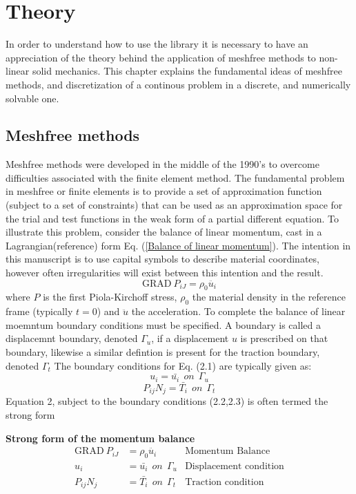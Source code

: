 

\chapter{Theory}		
In order to understand how to use the library it is necessary to have an appreciation of the theory behind the application of meshfree methods to non-linear solid mechanics. This chapter explains the fundamental ideas of meshfree methods, and discretization of a continous problem in a discrete, and numerically solvable one. 
\section{Meshfree methods}
Meshfree methods were developed in the middle of the 1990's to overcome difficulties associated with the finite element method. The fundamental problem in meshfree or finite elements is to provide a set of approximation function (subject to a set of constraints) that can be used as an approximation space for the trial and test functions in the weak form of a partial different equation.  To illustrate this problem, consider the balance of linear momentum, cast in a Lagrangian(reference) form Eq. (\ref{Balance of linear momentum}). The intention in this manuscript is to use capital symbols to describe material coordinates, however often irregularities will exist between this intention and the result. 
\begin{equation}\label{Balance of linear momentum}
\text{GRAD} ~ P_{iJ} = \rho_0 \ddot{u_i}
\end{equation}
where $P$ is the first Piola-Kirchoff stress, $\rho_0$ the material density in the reference frame (typically $t=0$) and $\ddot{u}$ the acceleration. To complete the balance of linear moemntum boundary conditions must be specified. A boundary is called a displacemnt boundary, denoted $\Gamma_u$, if a displacement $u$ is prescribed on that boundary, likewise a similar defintion is present for the traction boundary, denoted $\Gamma_t$ The boundary conditions for Eq. (2.1) are typically given as:
\begin{equation}
u_i=\bar{u_i} ~~on ~~\Gamma_u
\end{equation}
\begin{equation}
P_{ij}N_j = \bar{T_i} ~~on ~~\Gamma_t
\end{equation}
Equation 2, subject to the boundary conditions (2.2,2.3) is often termed the strong form 

	
\begin{tcolorbox}
\textbf{Strong form of the momentum balance}
\begin{align*}
\text{GRAD} ~ P_{iJ} &= \rho_0 \ddot{u_i} &\text{Momentum Balance} \\
u_i&=\bar{u_i} ~~on ~~\Gamma_u &\text{Displacement condition} \\
P_{ij}N_j &= \bar{T_i} ~~on ~~\Gamma_t &\text{Traction condition}
\end{align*}
\end{tcolorbox}

